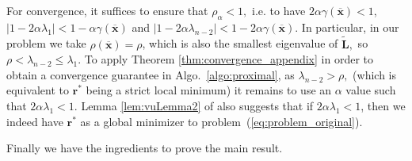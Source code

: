 \documentclass[nohyperref]{article}
\theoremstyle{plain}
\theoremstyle{definition}
\theoremstyle{remark}
\begin{document}
For convergence,  it suffices to ensure that $\rho_\alpha<1,$ i.e. to have $2\alpha\gamma(\mathbf{\overline{x}})<1$, $|1-2\alpha\lambda_1|<1-\alpha\gamma(\mathbf{\overline{x}})$ and $|1-2\alpha\lambda_{n-2}|<1-2\alpha\gamma(\mathbf{\overline{x}})$. In particular, in our problem we take 
$\rho(\mathbf{\overline{x}})=\rho$, which is also the smallest eigenvalue of $\widetilde{\mathbf{L}},$ so $\rho< \lambda_{n-2}\leq \lambda_1.$ 
To apply Theorem \ref{thm:convergence_appendix} in order to obtain a convergence guarantee in Algo.~\ref{algo:proximal}, as
$\lambda_{n-2}>\rho,$ (which is equivalent to $\mathbf{r}^*$ being a strict local minimum) it remains to use an $\alpha$ value such that $2\alpha\lambda_{1}<1.$ 
Lemma \ref{lem:vuLemma2} 
of  \cite{vu2019convergence} also suggests that  if $2\alpha\lambda_{1}<1$,  then 
we indeed have $\mathbf{r}^*$ as a global minimizer to problem~(\ref{eq:problem_original}).

Finally we have the ingredients to prove the main result.
\end{document}
